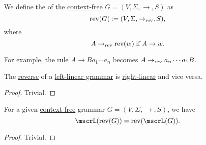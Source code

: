 \begin{definition}\label{def:reverse_grammar}
  We define the  of the \hyperref[def:chomsky_hierarchy/context_free]{context-free} \( G = (V, \Sigma, \to, S) \) as
  \begin{equation*}
    \operatorname{rev}(G) \coloneqq (V, \Sigma, \to_{\operatorname{rev}}, S),
  \end{equation*}
  where
  \begin{equation*}
    A \to_{\op{rev}} \op{rev}(w) \T{if} A \to w.
  \end{equation*}
\end{definition}
\begin{comments}
  \item For example, the rule \( A \to Ba_1 \cdots a_n \) becomes \( A \to_{\operatorname{rev}} a_n \cdots a_1 B \).
\end{comments}

\begin{proposition}\label{thm:reverse_linear_grammar}
  The \hyperref[def:reverse_grammar]{reverse} of a \hyperref[def:chomsky_hierarchy/regular]{left-linear grammar} is \hyperref[def:chomsky_hierarchy/regular]{right-linear} and vice versa.
\end{proposition}
\begin{proof}
  Trivial.
\end{proof}

\begin{proposition}\label{thm:reverse_grammar_language}
  For a given \hyperref[def:chomsky_hierarchy/context_free]{context-free} grammar \( G = (V, \Sigma, \to, S) \), we have
  \begin{equation*}
    \mscrL(\op{rev}(G)) = \op{rev}(\mscrL(G)).
  \end{equation*}
\end{proposition}
\begin{proof}
  Trivial.
\end{proof}

